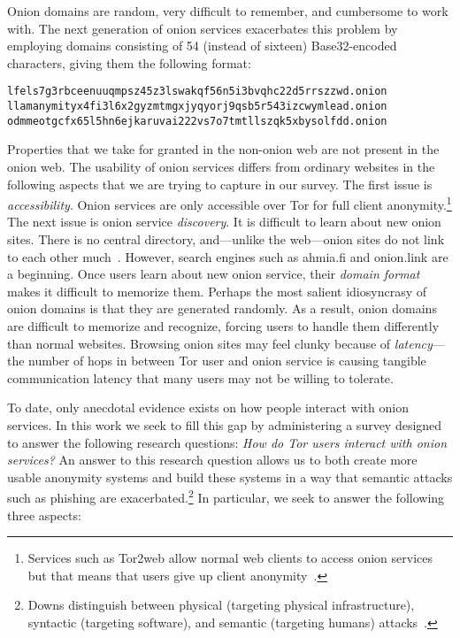 Onion domains are random, very difficult to remember, and cumbersome to work
with.  The next generation of onion services exacerbates this problem by
employing domains consisting of 54 (instead of sixteen) Base32-encoded
characters, giving them the following format:

{\footnotesize
\begin{verbatim}
lfels7g3rbceenuuqmpsz45z3lswakqf56n5i3bvqhc22d5rrszzwd.onion
llamanymityx4fi3l6x2gyzmtmgxjyqyorj9qsb5r543izcwymlead.onion
odmmeotgcfx65l5hn6ejkaruvai222vs7o7tmtllszqk5xbysolfdd.onion
\end{verbatim}
}

Properties that we take for granted in the non-onion web are not present in the
onion web.  The usability of onion services differs from ordinary websites in
the following aspects that we are trying to capture in our survey.  The first
issue is \emph{accessibility}.  Onion services are only accessible over Tor for
full client anonymity.\footnote{Services such as Tor2web allow normal web
clients to access onion services but that means that users give up client
anonymity~\cite{tor2web}.} The next issue is onion service \emph{discovery}.
It is difficult to learn about new onion sites.  There is no central directory,
and---unlike the web---onion sites do not link to each other
much~\cite{Griffith2017a}.  However, search engines such as ahmia.fi and
onion.link are a beginning.  Once users learn about new onion service, their
\emph{domain format} makes it difficult to memorize them.  Perhaps the most
salient idiosyncrasy of onion domains is that they are generated randomly.  As
a result, onion domains are difficult to memorize and recognize, forcing users
to handle them differently than normal websites.  Browsing onion sites may feel
clunky because of \emph{latency}---the number of hops in between Tor user and
onion service is causing tangible communication latency that many users may not
be willing to tolerate.

To date, only anecdotal evidence exists on how people interact with onion
services.  In this work we seek to fill this gap by administering a survey
designed to answer the following research questions: \emph{How do Tor users
interact with onion services?}  An answer to this research question allows us
to both create more usable anonymity systems and build these systems in a way
that semantic attacks such as phishing are exacerbated.\footnote{Downs \ea
distinguish between physical (\ie targeting physical infrastructure),
syntactic (\ie targeting software), and semantic (\ie targeting humans)
attacks~\cite[\S~1]{Downs2006a}.}  In particular, we seek to answer the
following three aspects:

